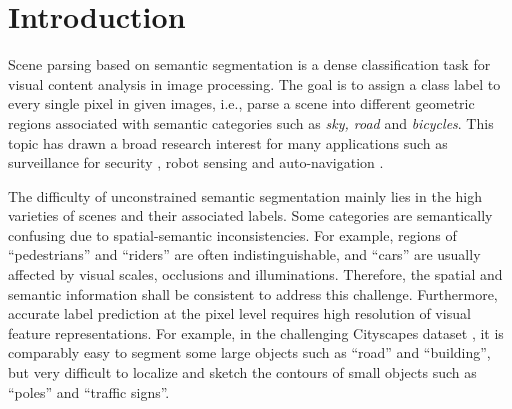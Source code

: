 \documentclass[10pt,twocolumn,twoside]{IEEEtran}
\begin{document}
\section{Introduction}

Scene parsing based on semantic segmentation is a dense classification task for visual content analysis in image processing. The goal is to assign a class label to every single pixel in given images, i.e., parse a scene into different geometric regions associated with semantic categories such as \emph{sky, road} and \emph{bicycles}. This topic has drawn a broad research interest for many applications such as surveillance for security \cite{STAP:STIS}, robot sensing \cite{ICRA14:ROBOT_SENSING} and auto-navigation \cite{CVPR17:NAV}.

The difficulty of unconstrained semantic segmentation mainly lies in the high varieties of scenes and their associated labels. Some categories are semantically confusing due to spatial-semantic inconsistencies. For example, regions of ``pedestrians'' and ``riders'' are often indistinguishable, and ``cars'' are usually affected by visual scales, occlusions and illuminations. Therefore, the spatial and semantic information shall be consistent to address this challenge. Furthermore, accurate label prediction at the pixel level requires high resolution of visual feature representations. For example, in the challenging Cityscapes dataset \cite{CVPR16:CITYSCAPES}, it is comparably easy to segment some large objects such as ``road'' and ``building'', but very difficult to localize and sketch the contours of small objects such as ``poles'' and ``traffic signs''. 
\end{document}
